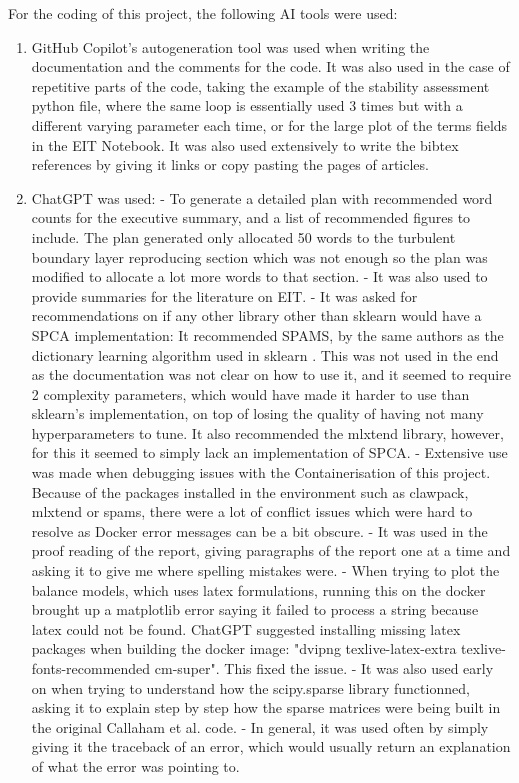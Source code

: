 \documentclass[12pt]{report} %
\begin{document}
For the coding of this project, the following AI tools were used:
\begin{enumerate}
  \item GitHub Copilot's autogeneration tool was used when writing the documentation and the comments for the code. It was also used in the case of repetitive parts of the code, taking the example of the stability assessment python file, where the same loop is essentially used 3 times but with a different varying parameter each time, or for the large plot of the terms fields in the EIT Notebook. It was also used extensively to write the bibtex references by giving it links or copy pasting the pages of articles.
  \item ChatGPT was used:
    \subitem - To generate a detailed plan with recommended word counts for the executive summary, and a list of recommended figures to include. The plan generated only allocated 50 words to the turbulent boundary layer reproducing section which was not enough so the plan was modified to allocate a lot more words to that section.
    \subitem - It was also used to provide summaries for the literature on EIT.
    \subitem - It was asked for recommendations on if any other library other than sklearn would have a SPCA implementation: It recommended SPAMS\cite{mairal2014spams}, by the same authors as the dictionary learning algorithm used in sklearn \cite{mairal2010online}. This was not used in the end as the documentation was not clear on how to use it, and it seemed to require 2 complexity parameters, which would have made it harder to use than sklearn's implementation, on top of losing the quality of having not many hyperparameters to tune. It also recommended the mlxtend library, however, for this it seemed to simply lack an implementation of SPCA.
    \subitem - Extensive use was made when debugging issues with the Containerisation of this project. Because of the packages installed in the environment such as clawpack, mlxtend or spams, there were a lot of conflict issues which were hard to resolve as Docker error messages can be a bit obscure.
    \subitem - It was used in the proof reading of the report, giving paragraphs of the report one at a time and asking it to give me where spelling mistakes were.
    \subitem - When trying to plot the balance models, which uses latex formulations, running this on the docker brought up a matplotlib error saying it failed to process a string because latex could not be found. ChatGPT suggested installing missing latex packages when building the docker image: "dvipng texlive-latex-extra texlive-fonts-recommended cm-super". This fixed the issue.
    \subitem - It was also used early on when trying to understand how the scipy.sparse library functionned, asking it to explain step by step how the sparse matrices were being built in the original Callaham et al. code.
    \subitem - In general, it was used often by simply giving it the traceback of an error, which would usually return an explanation of what the error was pointing to.

\end{enumerate}




\end{document}
